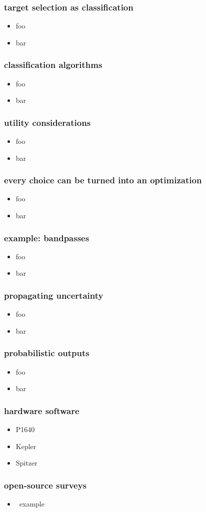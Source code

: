 \documentclass[pdftex]{beamer}
\begin{document}
\begin{frame}
  \frametitle{target selection as classification}
  \begin{itemize}
  \item foo
  \item bar
  \end{itemize}
\end{frame}

\begin{frame}
  \frametitle{classification algorithms}
  \begin{itemize}
  \item foo
  \item bar
  \end{itemize}
\end{frame}

\begin{frame}
  \frametitle{utility considerations}
  \begin{itemize}
  \item foo
  \item bar
  \end{itemize}
\end{frame}

\begin{frame}
  \frametitle{every choice can be turned into an optimization}
  \begin{itemize}
  \item foo
  \item bar
  \end{itemize}
\end{frame}

\begin{frame}
  \frametitle{example: bandpasses}
  \begin{itemize}
  \item foo
  \item bar
  \end{itemize}
\end{frame}

\begin{frame}
  \frametitle{propagating uncertainty}
  \begin{itemize}
  \item foo
  \item bar
  \end{itemize}
\end{frame}

\begin{frame}
  \frametitle{probabilistic outputs}
  \begin{itemize}
  \item foo
  \item bar
  \end{itemize}
\end{frame}

\begin{frame}
  \frametitle{hardware  software}
  \begin{itemize}
  \item P1640
  \item Kepler
  \item Spitzer
  \end{itemize}
\end{frame}

\begin{frame}
  \frametitle{open-source surveys}
  \begin{itemize}
  \item \hipparcos\ example
  \end{itemize}
\end{frame}
\end{document}
